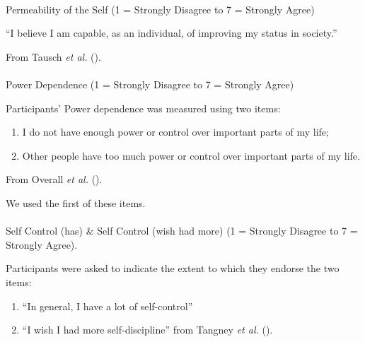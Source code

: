 \documentclass[
  single column]{article}
\makeatletter
\let\oldparagraph\paragraph
\renewcommand{\paragraph}{
    \@ifstar
      \xxxParagraphStar
      \xxxParagraphNoStar
  }
\newcommand{\xxxParagraphStar}[1]{\oldparagraph*{#1}\mbox{}}
\newcommand{\xxxParagraphNoStar}[1]{\oldparagraph{#1}\mbox{}}
\providecommand{\tightlist}{%
  \setlength{\itemsep}{0pt}\setlength{\parskip}{0pt}}\usepackage{longtable,booktabs,array}
\makeatother
\begin{document}
\paragraph{Permeability of the Self (1 = Strongly Disagree to 7 =
Strongly
Agree)}\label{permeability-of-the-self-1-strongly-disagree-to-7-strongly-agree}

``I believe I am capable, as an individual, of improving my status in
society.''

From Tausch \emph{et al.} ().

\paragraph{Power Dependence (1 = Strongly Disagree to 7 = Strongly
Agree)}\label{power-dependence-1-strongly-disagree-to-7-strongly-agree}

Participants' Power dependence was measured using two items:

\begin{enumerate}
\def\labelenumi{(\arabic{enumi})}
\tightlist
\item
  I do not have enough power or control over important parts of my life;
\item
  Other people have too much power or control over important parts of my
  life.
\end{enumerate}

From Overall \emph{et al.} ().

We used the first of these items.

\paragraph{Self Control (has) \& Self Control (wish had more) (1 =
Strongly Disagree to 7 = Strongly
Agree).}\label{self-control-has-self-control-wish-had-more-1-strongly-disagree-to-7-strongly-agree.}

Participants were asked to indicate the extent to which they endorse the
two items:

\begin{enumerate}
\def\labelenumi{\arabic{enumi}.}
\tightlist
\item
  ``In general, I have a lot of self-control''
\item
  ``I wish I had more self-discipline'' from Tangney \emph{et al.}
  ().
\end{enumerate}
\end{document}
